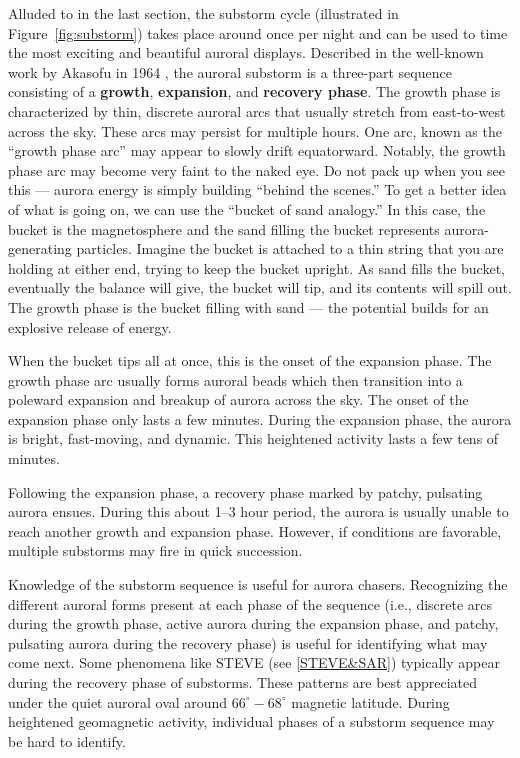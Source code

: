 \documentclass{article}
\renewcommand{\cite}[1]{\parencite{#1}}
\begin{document}
Alluded to in the last section, the substorm cycle (illustrated in Figure~\ref{fig:substorm}) takes place around once per night and can be used to time the most exciting and beautiful auroral displays. Described in the well-known work by Akasofu in 1964 \cite{Akasofu1964}, the auroral substorm is a three-part sequence consisting of a {\bf growth}, {\bf expansion}, and {\bf recovery phase}. The growth phase is characterized by thin, discrete auroral arcs that usually stretch from east-to-west across the sky. These arcs may persist for multiple hours. One arc, known as the ``growth phase arc'' may appear to slowly drift equatorward. Notably, the growth phase arc may become very faint to the naked eye. Do not pack up when you see this --- aurora energy is simply building ``behind the scenes.'' To get a better idea of what is going on, we can use the ``bucket of sand analogy.'' In this case, the bucket is the magnetosphere and the sand filling the bucket represents aurora-generating particles. Imagine the bucket is attached to a thin string that you are holding at either end, trying to keep the bucket upright. As sand fills the bucket, eventually the balance will give, the bucket will tip, and its contents will spill out. The growth phase is the bucket filling with sand --- the potential builds for an explosive release of energy. 

When the bucket tips all at once, this is the onset of the expansion phase. The growth phase arc usually forms auroral beads which then transition into a poleward expansion and breakup of aurora across the sky. The onset of the expansion phase only lasts a few minutes. During the expansion phase, the aurora is bright, fast-moving, and dynamic. This heightened activity lasts a few tens of minutes. 

Following the expansion phase, a recovery phase marked by patchy, pulsating aurora ensues. During this about 1--3 hour period, the aurora is usually unable to reach another growth and expansion phase. However, if conditions are favorable, multiple substorms may fire in quick succession.

Knowledge of the substorm sequence is useful for aurora chasers. Recognizing the different auroral forms present at each phase of the sequence (i.e., discrete arcs during the growth phase, active aurora during the expansion phase, and patchy, pulsating aurora during the recovery phase) is useful for identifying what may come next. Some phenomena like STEVE (see \ref{STEVE&SAR}) typically appear during the recovery phase of substorms. These patterns are best appreciated under the quiet auroral oval around $66^\circ-68^\circ$ magnetic latitude. During heightened geomagnetic activity, individual phases of a substorm sequence may be hard to identify.
\end{document}
